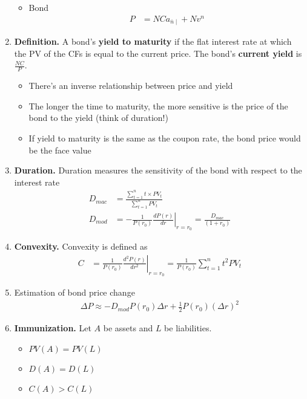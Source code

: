 \documentclass[12pt,twoside]{article}
\begin{document}
\begin{enumerate}
\begin{itemize}
			\item Bond
				\begin{align*}
					P & = NCa_{\overline{n}\mid} + Nv^n
				\end{align*}
		\end{itemize}

	\item \textbf{Definition.} A bond's \textbf{yield to maturity} if the flat interest rate at which the PV of the CFs is equal to the current price. The bond's \textbf{current yield} is $\frac{NC}{P}$.
		\begin{itemize}
			\item There's an inverse relationship between price and yield
			\item The longer the time to maturity, the more sensitive is the price of the bond to the yield (think of duration!)
			\item If yield to maturity is the same as the coupon rate, the bond price would be the face value
		\end{itemize}
		
	\item \textbf{Duration.} Duration measures the sensitivity of the bond with respect to the interest rate
		\begin{align*}
			D_{mac}& = \frac{\sum_{t=1}^n t\times PV_t }{\sum_{t=1}^n PV_t}\\
			D_{mod}& = -\frac{1}{P(r_0)}\left.\frac{dP(r)}{dr}\right\vert_{r=r_0} = \frac{D_{mac}}{(1+r_0)}
		\end{align*}
		
	\item \textbf{Convexity.} Convexity is defined as
		\begin{align*}
			C	&=\frac{1}{P(r_0)}\left.\frac{d^2P(r)}{dr^2}\right\vert_{r=r_0}
				=\frac{1}{P(r_0)}\sum_{t=1}^n t^2PV_t
		\end{align*}
	
	\item Estimation of bond price change
		\begin{align*}
			\Delta P \approx -D_{mod}P(r_0)\Delta r + \frac{1}{2}P(r_0) (\Delta r)^2
		\end{align*}

	\item \textbf{Immunization.} Let $A$ be assets and $L$ be liabilities.
		\begin{itemize}
			\item $PV(A) = PV(L)$
			\item $D(A) = D(L)$
			\item $C(A) > C(L)$
		\end{itemize}

\end{enumerate}
\end{document}
